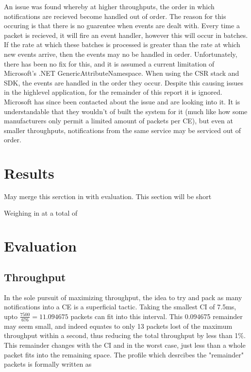\documentclass[]{article}
\begin{document}
An issue was found whereby at higher throughputs, the order in which notifications are recieved become handled out of order. The reason for this occuring is that there is no guarentee when events are dealt with. Every time a packet is recieved, it will fire an event handler, however this will occur in batches. If the rate at which these batches is processed is greater than the rate at which new events arrive, then the events may no be handled in order. Unfortunately, there has been no fix for this, and it is assumed a current limitation of Microsoft's .NET GenericAttributeNamespace. When using the \ac{CSR} stack and \ac{SDK}, the events are handled in the order they occur. Despite this causing issues in the highlevel application, for the remainder of this report it is ignored. Microsoft has since been contacted about the issue and are looking into it. It is understandable that they wouldn't of built the system for it (much like how some manufacturers only permit a limited amount of packets per \ac{CE}), but even at smaller throughputs, notifications from the same service may be serviced out of order. 





\clearpage

\section{Results}

May merge this serction in with evaluation. This section will be short

Weighing in at a total of 











\clearpage
\section{Evaluation}

\subsection{Throughput}

In the sole pursuit of maximizing throughput, the idea to try and pack as many notifications into a \ac{CE} is a superficial tactic. Taking the smallest \ac{CI} of 7.5ms, upto $\frac{7500}{676} = 11.094675$ packets can fit into this interval. This 0.094675 remainder may seem small, and indeed equates to only 13 packets lost of the maximum throughput within a second, thus reducing the total throughput by less than 1$\%$. This remainder changes with the \ac{CI} and in the worst case, just less than a whole packet fits into the remaining space. The profile which desrcibes the "remainder" packets is formally written as
\end{document}
